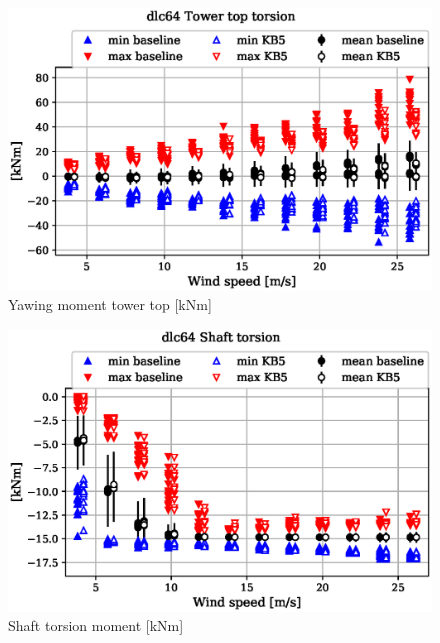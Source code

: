 \begin{figure}[!ht]
\begin{center}
	\includegraphics[width=.85\linewidth]{figures/baseline-vs-KB6/dlc64/tower-tower-node-004-momentvec-z_AA0008_AA0008.eps}
\end{center}
\caption{Yawing moment tower top [kNm]}
\label{fig:baseline-vs-KB6:dlc64:tower-top-yaw}
\end{figure}

\begin{figure}[!ht]
\begin{center}
	\includegraphics[width=.85\linewidth]{figures/baseline-vs-KB6/dlc64/shaft-shaft-node-001-momentvec-z_AA0008_AA0008.eps}
\end{center}
\caption{Shaft torsion moment [kNm]}
\label{fig:baseline-vs-KB6:dlc64:shaft-torsion}
\end{figure}

